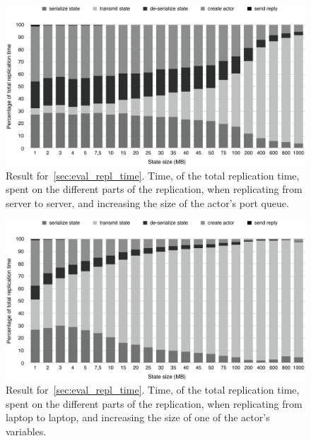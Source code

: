 \documentclass{cslthse-msc}
\begin{document}
\begin{figure}[hbt!]
\centering
\includegraphics[scale=0.5]{images/results/replication_time/server_parts_queue.pdf} 
\caption[Replication time parts in~\cref{sec:eval_repl_time}, server-server, increasing queue size]{Result for~\cref{sec:eval_repl_time}. Time, of the total replication time, spent on the different parts of the replication, when replicating from server to server, and increasing the size of the actor's port queue.} \label{fig:replication_time_parts_server_queue}
\end{figure}

\begin{figure}[hbt!]
\centering
\includegraphics[scale=0.5]{images/results/replication_time/laptop_parts_variable.pdf} 
\caption[Replication time parts in~\cref{sec:eval_repl_time}, laptop-laptop, increasing variable size]{Result for~\cref{sec:eval_repl_time}. Time, of the total replication time, spent on the different parts of the replication, when replicating from laptop to laptop, and increasing the size of one of the actor's variables.} \label{fig:replication_time_parts_laptop_variable}
\end{figure}
\end{document}

